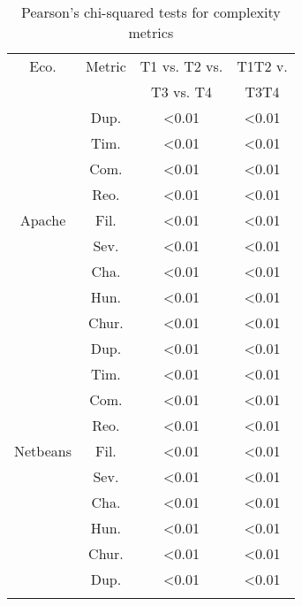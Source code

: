 
\begin{table}[]
\centering
\small
\caption{Pearson's chi-squared tests for complexity metrics}
\label{tab:chi-rq2}
\begin{tabular}{cccc}
Eco. & Metric & T1 vs. T2 vs.   & T1T2 v.  \\
          &     &  T3 vs. T4 & T3T4  \\ \hline \rowcolor{gray!25}
          & Dup.   & \textless0.01         & \textless0.01         \\  \rowcolor{gray!25}
          & Tim.   & \textless0.01         & \textless0.01         \\  \rowcolor{gray!25}
          & Com.   & \textless0.01         & \textless0.01         \\  \rowcolor{gray!25}
          & Reo.   & \textless0.01         & \textless0.01         \\  \rowcolor{gray!25}
Apache    & Fil.   & \textless0.01         & \textless0.01         \\  \rowcolor{gray!25}
          & Sev.   & \textless0.01         & \textless0.01         \\  \rowcolor{gray!25}
          & Cha.   & \textless0.01         & \textless0.01         \\  \rowcolor{gray!25}
          & Hun.   & \textless0.01         & \textless0.01         \\  \rowcolor{gray!25}
          & Chur.  & \textless0.01         & \textless0.01         \\
          & Dup.   & \textless0.01         & \textless0.01         \\
          & Tim.   & \textless0.01         & \textless0.01         \\
          & Com.   & \textless0.01         & \textless0.01         \\
          & Reo.   & \textless0.01         & \textless0.01         \\
Netbeans  & Fil.   & \textless0.01         & \textless0.01         \\
          & Sev.   & \textless0.01         & \textless0.01         \\
          & Cha.   & \textless0.01         & \textless0.01         \\
          & Hun.   & \textless0.01         & \textless0.01         \\
          & Chur.  & \textless0.01         & \textless0.01         \\  \rowcolor{gray!25}
          & Dup.   & \textless0.01         & \textless0.01         \\  \rowcolor{gray!25}

\end{tabular}
\end{table}
